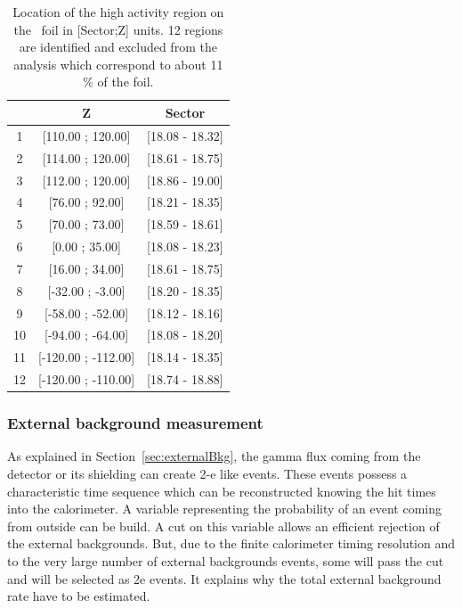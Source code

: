 \documentclass[main.tex]{subfiles}
\begin{document}
\begin{table}
\centering
\begin{tabular}{c|c|c}
  & Z                 & Sector \\
\midrule
1  & [110.00 ; 120.00]   & [18.08 - 18.32] \\ [0.1cm]
2  & [114.00 ; 120.00]   & [18.61 - 18.75] \\ [0.1cm]
3  & [112.00 ; 120.00]   & [18.86 - 19.00] \\ [0.1cm]
4  & [76.00 ; 92.00]     & [18.21 - 18.35] \\ [0.1cm]
5  & [70.00 ; 73.00]     & [18.59 - 18.61] \\ [0.1cm]
6  & [0.00 ; 35.00]      & [18.08 - 18.23] \\ [0.1cm]
7  & [16.00 ; 34.00]     & [18.61 - 18.75] \\ [0.1cm]
8  & [-32.00 ; -3.00]    & [18.20 - 18.35] \\ [0.1cm]
9  & [-58.00 ; -52.00]   & [18.12 - 18.16] \\ [0.1cm]
10 & [-94.00 ; -64.00]   & [18.08 - 18.20] \\ [0.1cm]
11 & [-120.00 ; -112.00] & [18.14 - 18.35] \\ [0.1cm]
12 & [-120.00 ; -110.00] & [18.74 - 18.88] \\
\bottomrule
\end{tabular}
\caption{Location of the high activity region on the \Cd~foil in [Sector;Z] units. 12 regions are identified and excluded from the analysis which correspond to about 11 \% of the foil.}
\label{Tab:HighActivityRegion}
\end{table}


\FloatBarrier


\subsubsection{External background measurement} \label{sec:External}


\NI As explained in Section~\ref{sec:externalBkg}, the gamma flux coming from the detector or its shielding can create 2-e like events. These events possess a characteristic time sequence which can be reconstructed knowing the hit times into the calorimeter. A variable representing the probability of an event coming from outside can be build. A cut on this variable allows an efficient rejection of the external backgrounds. But, due to the finite calorimeter timing resolution and to the very large number of external backgrounds events, some will pass the cut and will be selected as 2e events. It explains why the total external background rate have to be estimated. 
\end{document}
